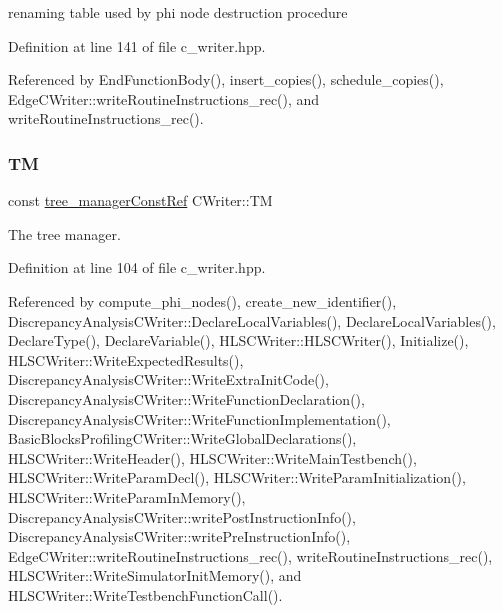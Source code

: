 renaming table used by phi node destruction procedure 



Definition at line 141 of file c\+\_\+writer.\+hpp.



Referenced by End\+Function\+Body(), insert\+\_\+copies(), schedule\+\_\+copies(), Edge\+C\+Writer\+::write\+Routine\+Instructions\+\_\+rec(), and write\+Routine\+Instructions\+\_\+rec().

\mbox{\label{classCWriter_a3cfb319409e8bbf3ff53cc960afd2da7}} 
\subsubsection{\texorpdfstring{TM}{TM}}
{\footnotesize\ttfamily const \hyperlink{tree__manager_8hpp_a792e3f1f892d7d997a8d8a4a12e39346}{tree\+\_\+manager\+Const\+Ref} C\+Writer\+::\+TM\hspace{0.3cm}{\ttfamily [protected]}}



The tree manager. 



Definition at line 104 of file c\+\_\+writer.\+hpp.



Referenced by compute\+\_\+phi\+\_\+nodes(), create\+\_\+new\+\_\+identifier(), Discrepancy\+Analysis\+C\+Writer\+::\+Declare\+Local\+Variables(), Declare\+Local\+Variables(), Declare\+Type(), Declare\+Variable(), H\+L\+S\+C\+Writer\+::\+H\+L\+S\+C\+Writer(), Initialize(), H\+L\+S\+C\+Writer\+::\+Write\+Expected\+Results(), Discrepancy\+Analysis\+C\+Writer\+::\+Write\+Extra\+Init\+Code(), Discrepancy\+Analysis\+C\+Writer\+::\+Write\+Function\+Declaration(), Discrepancy\+Analysis\+C\+Writer\+::\+Write\+Function\+Implementation(), Basic\+Blocks\+Profiling\+C\+Writer\+::\+Write\+Global\+Declarations(), H\+L\+S\+C\+Writer\+::\+Write\+Header(), H\+L\+S\+C\+Writer\+::\+Write\+Main\+Testbench(), H\+L\+S\+C\+Writer\+::\+Write\+Param\+Decl(), H\+L\+S\+C\+Writer\+::\+Write\+Param\+Initialization(), H\+L\+S\+C\+Writer\+::\+Write\+Param\+In\+Memory(), Discrepancy\+Analysis\+C\+Writer\+::write\+Post\+Instruction\+Info(), Discrepancy\+Analysis\+C\+Writer\+::write\+Pre\+Instruction\+Info(), Edge\+C\+Writer\+::write\+Routine\+Instructions\+\_\+rec(), write\+Routine\+Instructions\+\_\+rec(), H\+L\+S\+C\+Writer\+::\+Write\+Simulator\+Init\+Memory(), and H\+L\+S\+C\+Writer\+::\+Write\+Testbench\+Function\+Call().

